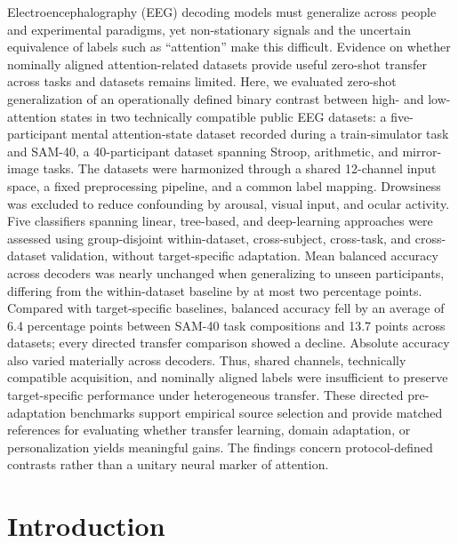 \documentclass[10pt,letterpaper]{article}
\begin{document}
Electroencephalography (EEG) decoding models must generalize across people and experimental paradigms, yet non-stationary signals and the uncertain equivalence of labels such as ``attention'' make this difficult. Evidence on whether nominally aligned attention-related datasets provide useful zero-shot transfer across tasks and datasets remains limited. Here, we evaluated zero-shot generalization of an operationally defined binary contrast between high- and low-attention states in two technically compatible public EEG datasets: a five-participant mental attention-state dataset recorded during a train-simulator task and SAM-40, a 40-participant dataset spanning Stroop, arithmetic, and mirror-image tasks. The datasets were harmonized through a shared 12-channel input space, a fixed preprocessing pipeline, and a common label mapping. Drowsiness was excluded to reduce confounding by arousal, visual input, and ocular activity. Five classifiers spanning linear, tree-based, and deep-learning approaches were assessed using group-disjoint within-dataset, cross-subject, cross-task, and cross-dataset validation, without target-specific adaptation. Mean balanced accuracy across decoders was nearly unchanged when generalizing to unseen participants, differing from the within-dataset baseline by at most two percentage points. Compared with target-specific baselines, balanced accuracy fell by an average of 6.4 percentage points between SAM-40 task compositions and 13.7 points across datasets; every directed transfer comparison showed a decline. Absolute accuracy also varied materially across decoders. Thus, shared channels, technically compatible acquisition, and nominally aligned labels were insufficient to preserve target-specific performance under heterogeneous transfer. These directed pre-adaptation benchmarks support empirical source selection and provide matched references for evaluating whether transfer learning, domain adaptation, or personalization yields meaningful gains. The findings concern protocol-defined contrasts rather than a unitary neural marker of attention.

\clearpage
{}
\linenumbers

\section*{Introduction}
\end{document}
